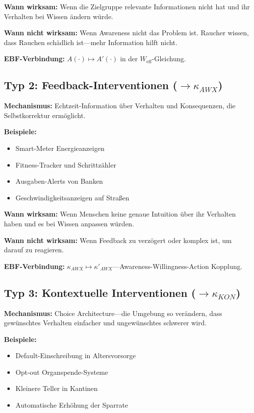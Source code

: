 \textbf{Wann wirksam:} Wenn die Zielgruppe relevante Informationen nicht hat und ihr Verhalten bei Wissen ändern würde.

\textbf{Wann nicht wirksam:} Wenn Awareness nicht das Problem ist. Raucher wissen, dass Rauchen schädlich ist---mehr Information hilft nicht.

\textbf{EBF-Verbindung:} $A(\cdot) \mapsto A'(\cdot)$ in der $W_{\text{eff}}$-Gleichung.


\subsection{Typ 2: Feedback-Interventionen ($\rightarrow \kappa_{AWX}$)}
\label{sec:17-type-feedback}

\textbf{Mechanismus:} Echtzeit-Information über Verhalten und Konsequenzen, die Selbstkorrektur ermöglicht.

\textbf{Beispiele:}
\begin{itemize}[nosep]
\item Smart-Meter Energieanzeigen
\item Fitness-Tracker und Schrittzähler
\item Ausgaben-Alerts von Banken
\item Geschwindigkeitsanzeigen auf Straßen
\end{itemize}

\textbf{Wann wirksam:} Wenn Menschen keine genaue Intuition über ihr Verhalten haben und es bei Wissen anpassen würden.

\textbf{Wann nicht wirksam:} Wenn Feedback zu verzögert oder komplex ist, um darauf zu reagieren.

\textbf{EBF-Verbindung:} $\kappa_{AWX} \mapsto \kappa'_{AWX}$---Awareness-Willingness-Action Kopplung.


\subsection{Typ 3: Kontextuelle Interventionen ($\rightarrow \kappa_{KON}$)}
\label{sec:17-type-contextual}

\textbf{Mechanismus:} Choice Architecture---die Umgebung so verändern, dass gewünschtes Verhalten einfacher und ungewünschtes schwerer wird.

\textbf{Beispiele:}
\begin{itemize}[nosep]
\item Default-Einschreibung in Altersvorsorge \citep{madrian2001}
\item Opt-out Organspende-Systeme
\item Kleinere Teller in Kantinen
\item Automatische Erhöhung der Sparrate
\end{itemize}

